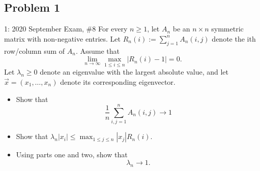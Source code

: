 \documentclass[../main]{subfiles}
\begin{document}
\subsection{Problem 1}
\begin{bbox}{{1: 2020 September Exam, \#8}}
    For every $n\geq 1$, let $A_n$ be an $n\times n$ symmetric matrix with non-negative entries. Let $R_n(i):= \sum_{j=1}^n A_n(i,j)$ denote the ith row/column sum of $A_n$. Assume that 
    \[
    \lim_{n\to \infty} \max_{1\leq i \leq n} |R_n(i) - 1| = 0.
    \]
    Let $\lambda_n \geq 0$ denote an eigenvalue with the largest absolute value, and let $\vec x = (x_1, \dots, x_n)$ denote its corresponding eigenvector. 
    \begin{itemize}
        \item Show that 
        \[
        \frac{1}{n} \sum_{i,j=1}^n A_n(i,j) \to 1
        \]
        \item Show that $\lambda_n |x_i| \leq \max_{1\leq j \leq n} |x_j| R_n(i)$.
        \item Using parts one and two, show that 
        \[
        \lambda_n \to 1.
        \]
    \end{itemize}
\end{bbox}
\end{document}
